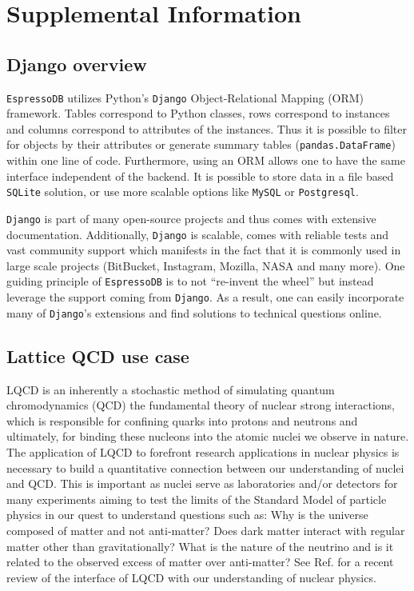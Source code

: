 \section{Supplemental Information}

\subsection{Django overview\label{django-overview}}

\texttt{EspressoDB} utilizes Python's \texttt{Django} Object-Relational
Mapping (ORM) framework. Tables correspond to Python classes, rows
correspond to instances and columns correspond to attributes of the
instances. Thus it is possible to filter for objects by their attributes
or generate summary tables (\texttt{pandas.DataFrame}) within one line
of code. Furthermore, using an ORM allows one to have the same interface
independent of the backend. It is possible to store data in a file based
\texttt{SQLite} solution, or use more scalable options like
\texttt{MySQL} or \texttt{Postgresql}.

\texttt{Django} is part of many open-source projects and thus comes with
extensive documentation. Additionally, \texttt{Django} is scalable,
comes with reliable tests and vast community support which manifests in
the fact that it is commonly used in large scale projects (BitBucket,
Instagram, Mozilla, NASA and many more). One guiding principle of
\texttt{EspressoDB} is to not ``re-invent the wheel'' but instead
leverage the support coming from \texttt{Django}. As a result, one can
easily incorporate many of \texttt{Django}'s extensions and find
solutions to technical questions online.

\subsection{Lattice QCD use case \label{lattice-qcd-use-case}}

LQCD is an inherently a stochastic method of simulating quantum
chromodynamics (QCD) the fundamental theory of nuclear strong
interactions, which is responsible for confining quarks into protons and
neutrons and ultimately, for binding these nucleons into the atomic
nuclei we observe in nature. The application of LQCD to forefront
research applications in nuclear physics is necessary to build a
quantitative connection between our understanding of nuclei and QCD.
This is important as nuclei serve as laboratories and/or detectors for
many experiments aiming to test the limits of the Standard Model of
particle physics in our quest to understand questions such as: Why is
the universe composed of matter and not anti-matter? Does dark matter
interact with regular matter other than gravitationally? What is the
nature of the neutrino and is it related to the observed excess of
matter over anti-matter? See Ref. \cite{Drischler:2019xuo} for a recent
review of the interface of LQCD with our understanding of nuclear
physics.

